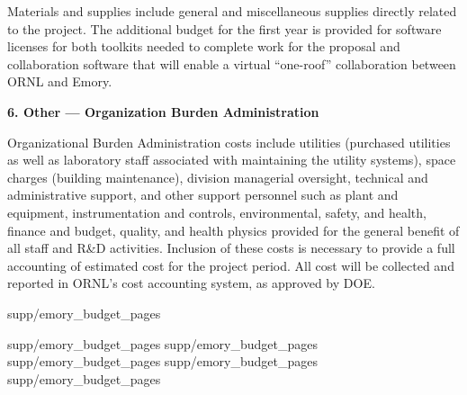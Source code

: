 \begin{description}
\begin{description}
    Materials and supplies include general and miscellaneous supplies directly
    related to the project.  The additional budget for the first year is
    provided for software licenses for both toolkits needed to complete work
    for the proposal and collaboration software that will enable a virtual
    ``one-roof'' collaboration between ORNL and Emory.
    
  \item {\bf 6. Other --- Organization Burden Administration}
    
    Organizational Burden Administration costs include utilities (purchased
    utilities as well as laboratory staff associated with maintaining the
    utility systems), space charges (building maintenance), division
    managerial oversight, technical and administrative support, and other
    support personnel such as plant and equipment, instrumentation and
    controls, environmental, safety, and health, finance and budget, quality,
    and health physics provided for the general benefit of all staff and R\&D
    activities.  Inclusion of these costs is necessary to provide a full
    accounting of estimated cost for the project period.  All cost will be
    collected and reported in ORNL's cost accounting system, as approved by
    DOE.
  
  \end{description}

\end{description}

\pagebreak


 {supp/emory_budget_pages}
 {supp/emory_budget_pages}
 {supp/emory_budget_pages}
 {supp/emory_budget_pages}
 {supp/emory_budget_pages}
 {supp/emory_budget_pages}

